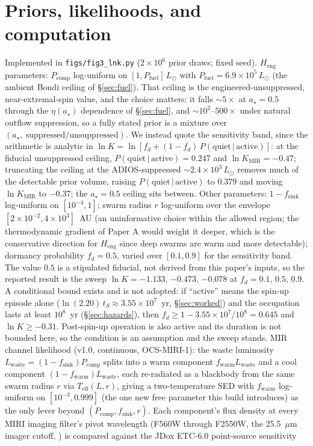 \documentclass[11pt]{article}
\newcommand{\astar}{\ensuremath{a_\star}}
\newcommand{\lnK}{\ensuremath{\ln K}}
\newcommand{\Heng}{\ensuremath{H_{\mathrm{eng}}}}
\begin{document}
\section{Priors, likelihoods, and computation}
\label{app:bayes}

Implemented in \texttt{figs/fig3\_lnk.py} ($2\times10^{6}$ prior draws; fixed seed). \Heng{} parameters: $P_{\mathrm{comp}}$ log-uniform on $[1, P_{\mathrm{fuel}}]\,L_{\odot}$ with $P_{\mathrm{fuel}} = 6.9\times10^{5}\,L_{\odot}$ (the ambient Bondi ceiling of \S\ref{sec:fuel}). That ceiling is the engineered-unsuppressed, near-extremal-spin value, and the choice matters: it falls $\sim 5\times$ at $\astar = 0.5$ through the $\eta(\astar)$ dependence of \S\ref{sec:fuel}, and $\sim 10^{2}$--$500\times$ under natural outflow suppression, so a fully stated prior is a mixture over $(\astar,\ \mathrm{suppressed/unsuppressed})$. We instead quote the sensitivity band, since the arithmetic is analytic in $\lnK = \ln[f_{d} + (1-f_{d})\,P(\mathrm{quiet}\,|\,\mathrm{active})]$: at the fiducial unsuppressed ceiling, $P(\mathrm{quiet}\,|\,\mathrm{active}) = 0.247$ and $\lnK_{\mathrm{MIR}} = -0.47$; truncating the ceiling at the ADIOS-suppressed $\sim 2.4\times10^{3}\,L_{\odot}$ removes much of the detectable prior volume, raising $P(\mathrm{quiet}\,|\,\mathrm{active})$ to $0.379$ and moving $\lnK_{\mathrm{MIR}}$ to $-0.37$; the $\astar = 0.5$ ceiling sits between. Other parameters: $1 - f_{\mathrm{sink}}$ log-uniform on $[10^{-4}, 1]$; swarm radius $r$ log-uniform over the envelope $[2\times10^{-2}, 4\times10^{3}]$~AU (an uninformative choice within the allowed region; the thermodynamic gradient of Paper A would weight it deeper, which is the conservative direction for \Heng{} since deep swarms are warm and more detectable); dormancy probability $f_{d} = 0.5$, varied over $[0.1, 0.9]$ for the sensitivity band. The value $0.5$ is a stipulated fiducial, not derived from this paper's inputs, so the reported result is the sweep $\lnK = -1.133$, $-0.473$, $-0.078$ at $f_{d} = 0.1$, $0.5$, $0.9$. A conditional bound exists and is not adopted: if ``active'' means the spin-up episode alone ($\ln(2.20)\,t_{S} \approx 3.55\times10^{7}$~yr, \S\ref{sec:worked}) and the occupation lasts at least $10^{8}$~yr (\S\ref{sec:hazards}), then $f_{d} \geq 1 - 3.55\times10^{7}/10^{8} = 0.645$ and $\lnK \geq -0.31$. Post-spin-up operation is also active and its duration is not bounded here, so the condition is an assumption and the sweep stands. MIR channel likelihood (v1.0, continuous, OCS-MIRI-1): the waste luminosity $L_{\mathrm{waste}} = (1-f_{\mathrm{sink}})P_{\mathrm{comp}}$ splits into a warm component $f_{\mathrm{warm}}L_{\mathrm{waste}}$ and a cool component $(1-f_{\mathrm{warm}})L_{\mathrm{waste}}$, each re-radiated as a blackbody from the same swarm radius $r$ via $T_{\mathrm{eff}}(L, r)$, giving a two-temperature SED with $f_{\mathrm{warm}}$ log-uniform on $[10^{-3}, 0.999]$ (the one new free parameter this build introduces) as the only lever beyond $(P_{\mathrm{comp}}, f_{\mathrm{sink}}, r)$. Each component's flux density at every MIRI imaging filter's pivot wavelength (F560W through F2550W, the 25.5~$\mu$m imager cutoff, \citealt{DickenMIRI2024}) is compared against the JDox ETC-6.0 point-source sensitivity 
\end{document}
